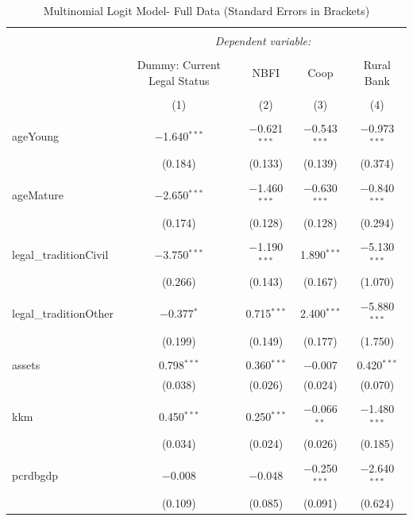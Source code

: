 \documentclass[a4paper, nobind]{templates/ociamthesis}
\begin{document}
\begin{table}[!htbp] \centering 
  \caption{Multinomial Logit Model- Full Data (Standard Errors in Brackets)} 
  \label{} 
\footnotesize 
\begin{tabular}{@{\extracolsep{5pt}}lcccc} 
\\[-1.8ex]\hline 
\hline \\[-1.8ex] 
 & \multicolumn{4}{c}{\textit{Dependent variable:}} \\ 
\cline{2-5} 
\\[-1.8ex] & Dummy: Current Legal Status & NBFI & Coop & Rural Bank \\ 
\\[-1.8ex] & (1) & (2) & (3) & (4)\\ 
\hline \\[-1.8ex] 
 ageYoung & $-$1.640$^{***}$ & $-$0.621$^{***}$ & $-$0.543$^{***}$ & $-$0.973$^{***}$ \\ 
  & (0.184) & (0.133) & (0.139) & (0.374) \\ 
  & & & & \\ 
 ageMature & $-$2.650$^{***}$ & $-$1.460$^{***}$ & $-$0.630$^{***}$ & $-$0.840$^{***}$ \\ 
  & (0.174) & (0.128) & (0.128) & (0.294) \\ 
  & & & & \\ 
 legal\_traditionCivil & $-$3.750$^{***}$ & $-$1.190$^{***}$ & 1.890$^{***}$ & $-$5.130$^{***}$ \\ 
  & (0.266) & (0.143) & (0.167) & (1.070) \\ 
  & & & & \\ 
 legal\_traditionOther & $-$0.377$^{*}$ & 0.715$^{***}$ & 2.400$^{***}$ & $-$5.880$^{***}$ \\ 
  & (0.199) & (0.149) & (0.177) & (1.750) \\ 
  & & & & \\ 
 assets & 0.798$^{***}$ & 0.360$^{***}$ & $-$0.007 & 0.420$^{***}$ \\ 
  & (0.038) & (0.026) & (0.024) & (0.070) \\ 
  & & & & \\ 
 kkm & 0.450$^{***}$ & 0.250$^{***}$ & $-$0.066$^{**}$ & $-$1.480$^{***}$ \\ 
  & (0.034) & (0.024) & (0.026) & (0.185) \\ 
  & & & & \\ 
 pcrdbgdp & $-$0.008 & $-$0.048 & $-$0.250$^{***}$ & $-$2.640$^{***}$ \\ 
  & (0.109) & (0.085) & (0.091) & (0.624) \\ 

\end{tabular}
\end{table}
\end{document}
